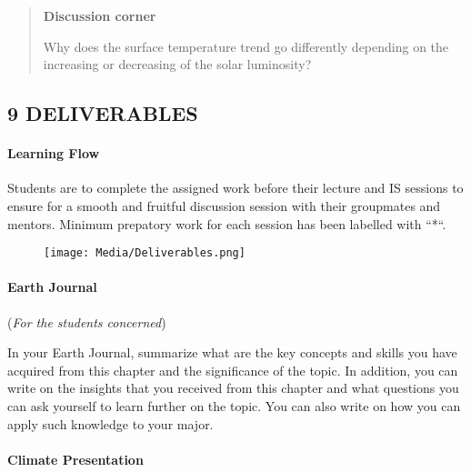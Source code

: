 \documentclass[
  letterpaper,
  DIV=11,
  numbers=noendperiod]{scrartcl}
\let\oldparagraph\paragraph
\renewcommand{\paragraph}[1]{\oldparagraph{#1}\mbox{}}
\begin{document}
\begin{quote}
\textbf{Discussion corner}

Why does the surface temperature trend go differently depending on the
increasing or decreasing of the solar luminosity?
\end{quote}

\hypertarget{deliverables}{%
\subsection{9 \textbar{} DELIVERABLES}\label{deliverables}}

\hypertarget{learning-flow}{%
\paragraph{Learning Flow}\label{learning-flow}}

Students are to complete the assigned work before their lecture and IS
sessions to ensure for a smooth and fruitful discussion session with
their groupmates and mentors. Minimum prepatory work for each session
has been labelled with ``*``.

\begin{figure}

{\centering \texttt{[image: Media/Deliverables.png]}

}

\end{figure}

\hypertarget{earth-journal}{%
\paragraph{Earth Journal}\label{earth-journal}}

(\emph{For the students concerned})

In your Earth Journal, summarize what are the key concepts and skills
you have acquired from this chapter and the significance of the topic.
In addition, you can write on the insights that you received from this
chapter and what questions you can ask yourself to learn further on the
topic. You can also write on how you can apply such knowledge to your
major.

\hypertarget{climate-presentation}{%
\paragraph{Climate Presentation}\label{climate-presentation}}
\end{document}

